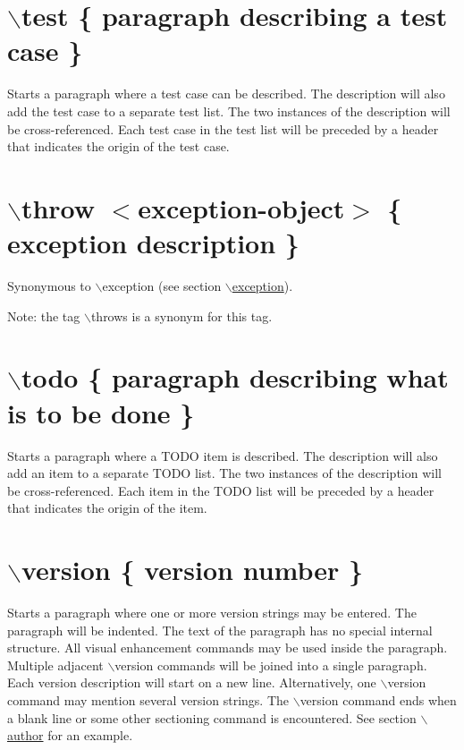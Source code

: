  \hypertarget{commands_cmdtest}{}\section{$\backslash$test \{ paragraph describing a test case \}}\label{commands_cmdtest}
 Starts a paragraph where a test case can be described. The description will also add the test case to a separate test list. The two instances of the description will be cross-referenced. Each test case in the test list will be preceded by a header that indicates the origin of the test case.



 \hypertarget{commands_cmdthrow}{}\section{$\backslash$throw $<$exception-object$>$ \{ exception description \}}\label{commands_cmdthrow}
 Synonymous to $\backslash$exception (see section \hyperlink{commands_cmdexception}{$\backslash$exception}).

\begin{Desc}
\item[Note: ]the tag $\backslash$throws is a synonym for this tag.\end{Desc}


 \hypertarget{commands_cmdtodo}{}\section{$\backslash$todo \{ paragraph describing what is to be done \}}\label{commands_cmdtodo}
 Starts a paragraph where a TODO item is described. The description will also add an item to a separate TODO list. The two instances of the description will be cross-referenced. Each item in the TODO list will be preceded by a header that indicates the origin of the item.



 \hypertarget{commands_cmdversion}{}\section{$\backslash$version \{ version number \}}\label{commands_cmdversion}
 Starts a paragraph where one or more version strings may be entered. The paragraph will be indented. The text of the paragraph has no special internal structure. All visual enhancement commands may be used inside the paragraph. Multiple adjacent $\backslash$version commands will be joined into a single paragraph. Each version description will start on a new line. Alternatively, one $\backslash$version command may mention several version strings. The $\backslash$version command ends when a blank line or some other sectioning command is encountered. See section \hyperlink{commands_cmdauthor}{$\backslash$author} for an example.



